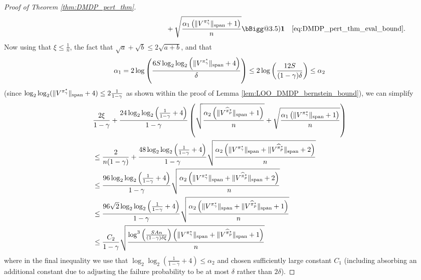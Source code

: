 \documentclass{article}
\makeatletter
\newcommand{\Biggg}{\bBigg@{3.5}}
\theoremstyle{plain}
\theoremstyle{plain}
\theoremstyle{remark}
\theoremstyle{plain}
\theoremstyle{plain}
\newcommand{\pistar}{\pi^\star}
\newcommand{\one}{\mathbf{1}}
\newcommand{\pihat}{\widehat{\pi}}
\newcommand{\pihatpert}{\pihat^\star_p}
\makeatother
\begin{document}
\begin{proof}[Proof of Theorem \ref{thm:DMDP_pert_thm}]
\begin{align*}
        & \quad \quad \quad \quad\quad \quad \quad \quad\quad \quad \quad \quad\quad \quad \quad \quad\quad \quad \quad \quad + \sqrt{\frac{ \alpha_1 \left( \spannorm{V^{\pistar_\gamma}} + 1\right)}{n}} \Biggg)\one && \text{\eqref{eq:DMDP_pert_thm_eval_bound}}.
    \end{align*}
    Now using that $\xi \leq \frac{1}{n}$, the fact that $\sqrt{a} + \sqrt{b} \leq 2\sqrt{a + b}$, and that
    \begin{align*}
        \alpha_1 = 2 \log \left( \frac{6 S \log_2 \log_2 \left(\spannorm{V^{\pistar_\gamma}}+4 \right)}{\delta} \right) \leq 2 \log \left( \frac{12 S }{(1-\gamma)\delta} \right) \leq \alpha_2
    \end{align*}
    (since $\log_2 \log_2 (\spannorm{V^{\pistar_\gamma}}+4) \leq 2\frac{1}{1-\gamma}$ as shown within the proof of Lemma \ref{lem:LOO_DMDP_bernstein_bound}), we can simplify
    \begin{align*}
        &\frac{2\xi}{1-\gamma} + \frac{24 \log_2 \log_2 \left( \frac{1}{1-\gamma} + 4\right)  }{1-\gamma}\left(\sqrt{\frac{ \alpha_2 \left( \spannorm{V^{\pihatpert}} + 1\right)}{n}} + \sqrt{\frac{ \alpha_1 \left( \spannorm{V^{\pistar_\gamma}} + 1\right)}{n}} \right) \\
        & \leq \frac{2}{n(1-\gamma)} + \frac{48 \log_2 \log_2 \left( \frac{1}{1-\gamma} + 4\right)  }{1-\gamma}\sqrt{\frac{ \alpha_2 \left( \spannorm{V^{\pistar_\gamma}} + \spannorm{V^{\pihatpert}} + 2 \right)}{n}} \\
        & \leq  \frac{96 \log_2 \log_2 \left( \frac{1}{1-\gamma} + 4\right)  }{1-\gamma}\sqrt{\frac{ \alpha_2 \left( \spannorm{V^{\pistar_\gamma}} + \spannorm{V^{\pihatpert}} + 2 \right)}{n}} \\
        & \leq   \frac{96 \sqrt{2} \log_2 \log_2 \left( \frac{1}{1-\gamma} + 4\right)  }{1-\gamma}\sqrt{\frac{ \alpha_2 \left( \spannorm{V^{\pistar_\gamma}} + \spannorm{V^{\pihatpert}} + 1 \right)}{n}} \\
        & \leq   \frac{ C_2  }{1-\gamma}\sqrt{\frac{ \log^3 \left( \frac{S  A n}{(1-\gamma)\delta \xi}\right) \left( \spannorm{V^{\pistar_\gamma}} + \spannorm{V^{\pihatpert}} + 1 \right)}{n}} 
    \end{align*}
    where in the final inequality we use that $\log_2 \log_2 \left( \frac{1}{1-\gamma} + 4\right) \leq \alpha_2$ and chosen sufficiently large constant $C_1$ (including absorbing an additional constant due to adjusting the failure probability to be at most $\delta$ rather than $2 \delta$).
\end{proof}
\end{document}
